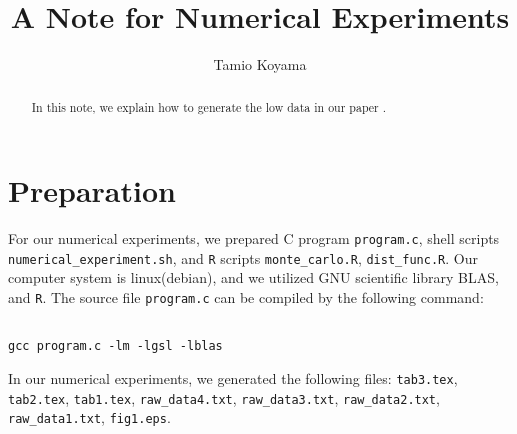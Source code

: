 \documentclass[12pt]{article}
\title{A Note for Numerical Experiments}
\author{Tamio Koyama}
\date{}
\begin{document}
\maketitle

\begin{abstract}
In this note, we explain how to generate the low data in our paper
\cite{2015koyama2}.
\end{abstract}

\section{Preparation}
For our numerical experiments, we prepared 
C program {\tt program.c}, 
shell scripts \\{\tt numerical\_experiment.sh}, 
and {\tt R} scripts {\tt monte\_carlo.R}, {\tt dist\_func.R}.
Our computer system is linux(debian), and we utilized GNU scientific library
BLAS, and {\tt R}.
The source file {\tt program.c} can be compiled by the following command:
\begin{lstlisting}[style=BashInputStyle]

gcc program.c -lm -lgsl -lblas
\end{lstlisting}

 
In our numerical experiments, we generated the following files:
{\tt tab3.tex}, 
{\tt tab2.tex}, 
{\tt tab1.tex}, 
{\tt raw\_data4.txt}, 
{\tt raw\_data3.txt}, 
{\tt raw\_data2.txt}, 
{\tt raw\_data1.txt},
{\tt fig1.eps}.
\end{document}
